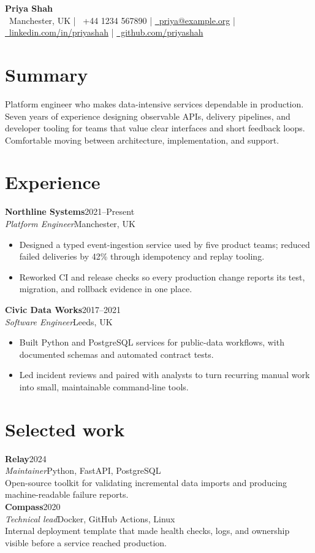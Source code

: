 \documentclass[10pt]{article}
\newcommand{\entry}[4]{\textbf{#1}\hfill #2\\\textit{#3}\hfill #4\\}
\begin{document}
\begin{center}
  {\LARGE\bfseries\color{ink} Priya Shah}\\[3pt]
  \faMapMarker\ Manchester, UK \enspace|\enspace
  \faPhone\ +44 1234 567890 \enspace|\enspace
  \href{mailto:priya@example.org}{\faEnvelope\ priya@example.org} \enspace|\enspace
  \href{https://www.linkedin.com/in/priyashah}{\faLinkedin\ linkedin.com/in/priyashah} \enspace|\enspace
  \href{https://github.com/priyashah}{\faGithub\ github.com/priyashah}
\end{center}
\small
\section*{Summary}
Platform engineer who makes data-intensive services dependable in production.
Seven years of experience designing observable APIs, delivery pipelines, and
developer tooling for teams that value clear interfaces and short feedback
loops. Comfortable moving between architecture, implementation, and support.
\section*{Experience}
\entry{Northline Systems}{2021--Present}{Platform Engineer}{Manchester, UK}
\begin{itemize}
  \item Designed a typed event-ingestion service used by five product teams;
    reduced failed deliveries by 42\% through idempotency and replay tooling.
  \item Reworked CI and release checks so every production change reports its
    test, migration, and rollback evidence in one place.
\end{itemize}
\entry{Civic Data Works}{2017--2021}{Software Engineer}{Leeds, UK}
\begin{itemize}
  \item Built Python and PostgreSQL services for public-data workflows, with
    documented schemas and automated contract tests.
  \item Led incident reviews and paired with analysts to turn recurring manual
    work into small, maintainable command-line tools.
\end{itemize}
\section*{Selected work}
\entry{Relay}{2024}{Maintainer}{Python, FastAPI, PostgreSQL}
Open-source toolkit for validating incremental data imports and producing
machine-readable failure reports.\\[4pt]
\entry{Compass}{2020}{Technical lead}{Docker, GitHub Actions, Linux}
Internal deployment template that made health checks, logs, and ownership
visible before a service reached production.
\end{document}
